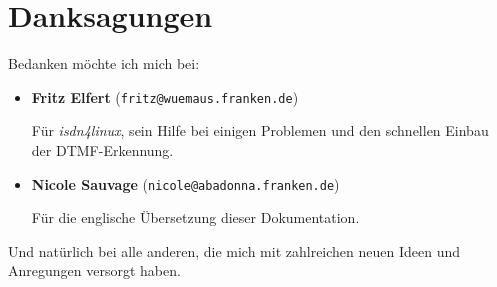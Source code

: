 \section{Danksagungen\label{id-danksagungen}}



Bedanken m\"{o}chte ich mich bei:

\begin{itemize}
\item {\bf Fritz Elfert} ({\tt fritz@wuemaus.franken.de})


F\"{u}r {\em isdn4linux\/}, sein Hilfe bei einigen Problemen und den
schnellen Einbau der DTMF-Erkennung.



\item {\bf Nicole Sauvage} ({\tt nicole@abadonna.franken.de})


F\"{u}r die englische \"{U}bersetzung dieser Dokumentation.



\end{itemize}


Und nat\"{u}rlich bei alle anderen, die mich mit zahlreichen neuen Ideen und
Anregungen versorgt haben.




